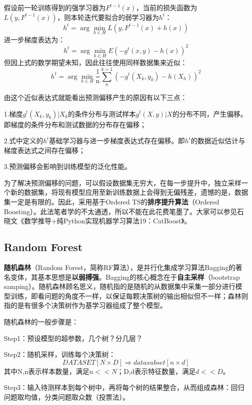 假设前一轮训练得到的强学习器为$F^{t-1}(x)$，当前的损失函数为$L(y,F^{t-1}(x))$，则本轮迭代要拟合的弱学习器为$h^{t}$：
\begin{equation}h^t=\arg\min_{h\in H}L(y,F^{t-1}(x)+h(x))\end{equation}
进一步梯度表达为：
\begin{equation}h^t=\arg\min_{h\in H}E(-g^t(x,y)-h(x))^2\end{equation}
但因上式的数学期望未知，因此往往使用同样数据集来近似：
\begin{equation}h^t=\arg\min_{h\in H}\frac1{\mathrm{n}}\sum_n^{k=1}(-g^t(X_k,y_k)-h(X_h))^2\end{equation}

由这个近似表达式就能看出预测偏移产生的原因有以下三点：

1.梯度$g^t(X_k,y_k)|X_k$的条件分布与测试样本$g^t(X,y)|X$的分布不同，产生偏移。即梯度的条件分布和测试数据的分布存在偏移；

2.式中定义的$h^t$基础学习器与进一步梯度表达式存在偏移。即$h^t$的数据近似估计与梯度表达式之间存在偏移；

3.预测偏移会影响到训练模型的泛化性能。

为了解决预测偏移的问题，可以假设数据集无穷大，在每一步提升中，独立采样一个新的数据集，将现有模型应用至新训练数据上会得到无偏残差，遗憾的是，数据集一定是有限的。因此，采用基于Ordered TS的\textbf{排序提升算法}（Ordered Boosting）。此法笔者学的不太通透，所以不能在此花费笔墨了。大家可以参见石晓文《数学推导+纯Python实现机器学习算法19：CatBoost》。

\subsection{Random Forest}
\textbf{随机森林}（Random Forest，简称RF算法），是并行化集成学习算法Bagging的著名变体，其基本思想是\textbf{以弱搏强}。Bagging的核心概念在于\textbf{自主采样}（bootstrap samping）。随机森林顾名思义，随机指的是随机的从数据集中采集一部分进行模型训练，即看问题的角度不一样，以保证每颗决策树的输出相似但不一样；森林则指的是有很多个决策树作为基学习器组成了整个模型。

随机森林的一般步骤是：

Step1：预设模型的超参数，几个树？分几层？

Step2：随机采样，训练每个决策树：
\begin{equation}DATASET[N\times D]\Rightarrow datasubset[n\times d]\end{equation}
其中N,n表示样本数量，满足$n<<N$；D,d表示特征数量，满足$d<<D$。

Step3：输入待测样本到每个树中，再将每个树的结果整合，从而组成森林：回归问题取均值，分类问题取众数（投票法）。
